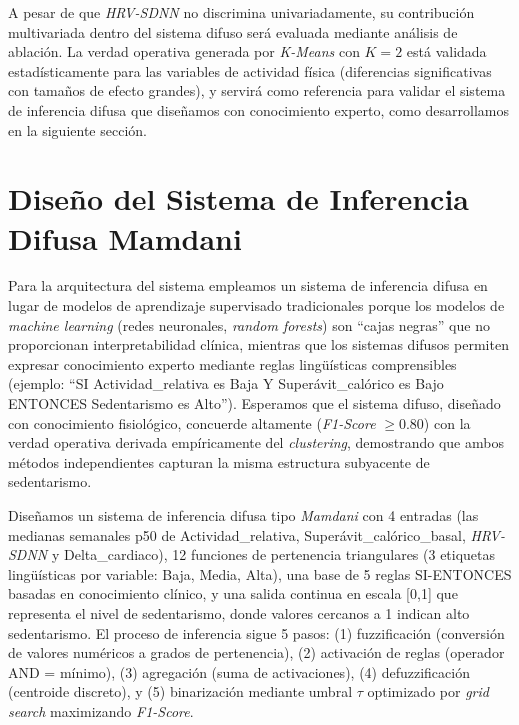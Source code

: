 \FloatBarrier

A pesar de que \textit{HRV-SDNN} no discrimina univariadamente, su contribución multivariada dentro del sistema difuso será evaluada mediante análisis de ablación. La verdad operativa generada por \textit{K-Means} con $K=2$ está validada estadísticamente para las variables de actividad física (diferencias significativas con tamaños de efecto grandes), y servirá como referencia para validar el sistema de inferencia difusa que diseñamos con conocimiento experto, como desarrollamos en la siguiente sección.

\section{Diseño del Sistema de Inferencia Difusa Mamdani}
\label{sec:sistema_difuso}

Para la arquitectura del sistema empleamos un sistema de inferencia difusa en lugar de modelos de aprendizaje supervisado tradicionales porque los modelos de \textit{machine learning} (redes neuronales, \textit{random forests}) son ``cajas negras'' que no proporcionan interpretabilidad clínica, mientras que los sistemas difusos permiten expresar conocimiento experto mediante reglas lingüísticas comprensibles (ejemplo: ``SI Actividad\_relativa es Baja Y Superávit\_calórico es Bajo ENTONCES Sedentarismo es Alto''). Esperamos que el sistema difuso, diseñado con conocimiento fisiológico, concuerde altamente (\textit{F1-Score} $\geq 0.80$) con la verdad operativa derivada empíricamente del \textit{clustering}, demostrando que ambos métodos independientes capturan la misma estructura subyacente de sedentarismo.

Diseñamos un sistema de inferencia difusa tipo \textit{Mamdani} con 4 entradas (las medianas semanales p50 de Actividad\_relativa, Superávit\_calórico\_basal, \textit{HRV-SDNN} y Delta\_cardiaco), 12 funciones de pertenencia triangulares (3 etiquetas lingüísticas por variable: Baja, Media, Alta), una base de 5 reglas SI-ENTONCES basadas en conocimiento clínico, y una salida continua en escala [0,1] que representa el nivel de sedentarismo, donde valores cercanos a 1 indican alto sedentarismo. El proceso de inferencia sigue 5 pasos: (1) fuzzificación (conversión de valores numéricos a grados de pertenencia), (2) activación de reglas (operador AND = mínimo), (3) agregación (suma de activaciones), (4) defuzzificación (centroide discreto), y (5) binarización mediante umbral $\tau$ optimizado por \textit{grid search} maximizando \textit{F1-Score}.

